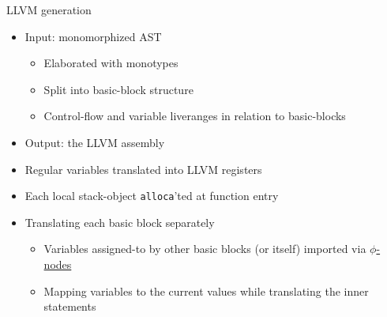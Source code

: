 \documentclass[aspectratio=169]{beamer}
\newcommand{\li}[1]{\lstinline{#1}}
\begin{document}
\begin{frame}{LLVM generation}
  \begin{itemize}
    \item[\faSignIn] Input: monomorphized AST
    \begin{itemize}
      \item Elaborated with monotypes
      \item Split into basic-block structure
      \item Control-flow and variable liveranges in relation to basic-blocks
    \end{itemize} 
    \item[\faSignOut] Output: the LLVM assembly
    \item Regular variables translated into LLVM registers
    \item Each local stack-object \li{alloca}'ted at function entry
    \item Translating each basic block separately
    \begin{itemize}
      \item[\only<1,3>{\faChevronRight}\only<2>{\faChevronDown}] Variables assigned-to by other basic blocks (or itself) imported via \underline{$\phi$-nodes}
      \item[\only<1,2>{\faChevronRight}\only<3>{\faChevronDown}] Mapping variables to the current values while translating the inner statements
    \end{itemize}
  \end{itemize}
\end{frame}
\end{document}
